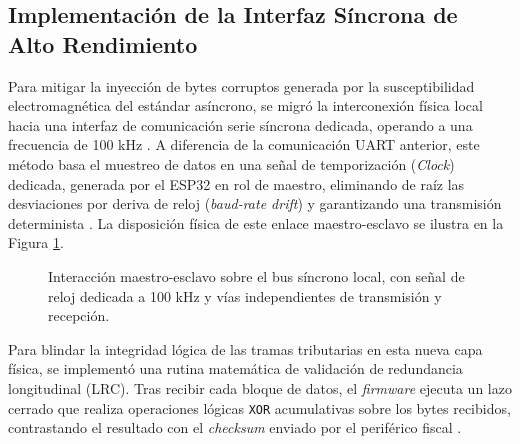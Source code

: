 \subsection{Implementación de la Interfaz Síncrona de Alto Rendimiento}

\par Para mitigar la inyección de bytes corruptos generada por la susceptibilidad electromagnética del estándar asíncrono, se migró la interconexión física local hacia una interfaz de comunicación serie síncrona dedicada, operando a una frecuencia de 100 kHz \cite{Espressif_ESP32_Datasheet}. A diferencia de la comunicación UART anterior, este método basa el muestreo de datos en una señal de temporización (\textit{Clock}) dedicada, generada por el ESP32 en rol de maestro, eliminando de raíz las desviaciones por deriva de reloj (\textit{baud-rate drift}) y garantizando una transmisión determinista \cite{Espressif_ESP_IDF_v552}. La disposición física de este enlace maestro-esclavo se ilustra en la Figura \ref{fig:bus_sincrono}.\\

\begin{figure}[htbp]
\centering
{}
\caption{Interacción maestro-esclavo sobre el bus síncrono local, con señal de reloj dedicada a 100 kHz y vías independientes de transmisión y recepción.}
\label{fig:bus_sincrono}
\end{figure}

\par Para blindar la integridad lógica de las tramas tributarias en esta nueva capa física, se implementó una rutina matemática de validación de redundancia longitudinal (LRC). Tras recibir cada bloque de datos, el \textit{firmware} ejecuta un lazo cerrado que realiza operaciones lógicas \texttt{XOR} acumulativas sobre los bytes recibidos, contrastando el resultado con el \textit{checksum} enviado por el periférico fiscal \cite{TheFactoryHKA_Manual_Protocolos}.\\

